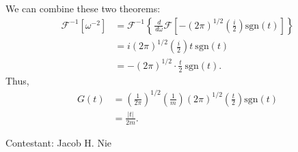 \documentclass[12pt]{article}
\newcommand{\diff}{\,\textit{d}}
\begin{document}
We can combine these two theorems:
\begin{align*}
	\mathcal{F}^{-1}[\omega^{-2}] &= \mathcal{F}^{-1} \left\{ \frac{\diff}{\diff \omega} \mathcal{F}\left[ -(2\pi)^{1/2} \left( \frac{i}{2} \right)\text{sgn}(t) \right] \right\} \\
				      &= i (2\pi)^{1/2} \left( \frac{i}{2} \right) t \ \text{sgn}(t) \\
				      &= -\left( 2\pi\right)^{1/2} \cdot \frac{t}{2} \ \text{sgn}(t).
\end{align*}
Thus,
\begin{align*}
	G(t) &= \left( \frac{1}{2\pi} \right)^{1/2} \left( \frac{1}{m} \right) \left( 2\pi \right)^{1/2} \left( \frac{t}{2} \right)\text{sgn}(t) \\
	     &= \frac{|t|}{2m}.
\end{align*}






\vspace{1cm}

\hfill Contestant: Jacob H. Nie
\end{document}
